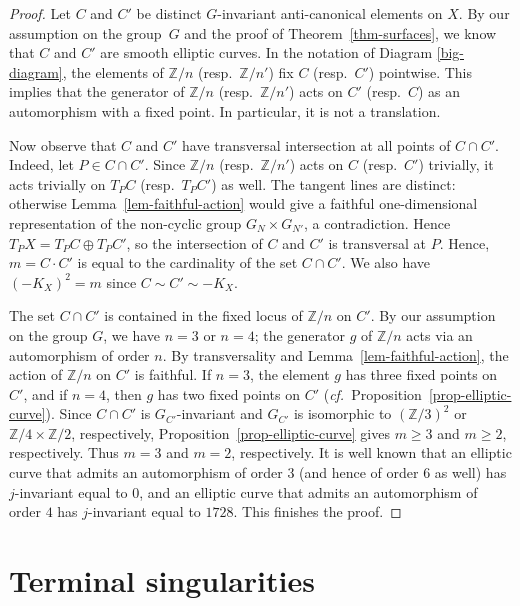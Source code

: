 \documentclass[11pt]{amsart}
\numberwithin{equation}{section}
\theoremstyle{definition}
\theoremstyle{remark}
\begin{document}
\begin{proof}
Let $C$ and $C'$ be distinct $G$-invariant anti-canonical elements on $X$. By our assumption on the group~$G$ and the proof of Theorem~\ref{thm-surfaces},  we know that $C$ and $C'$ are smooth elliptic curves. 
In the notation of Diagram \eqref{big-diagram}, the elements of $\mathbb{Z}/n$ (resp.\ $\mathbb{Z}/n'$) fix $C$ (resp.\ $C'$) pointwise. This implies that the generator of $\mathbb{Z}/n$ (resp.\ $\mathbb{Z}/n'$) acts on $C'$ (resp.\ $C$) as an automorphism with a fixed point. In particular, it is not a translation.

Now observe that $C$ and $C'$ have transversal intersection at all points of $C\cap C'$. Indeed, let $P\in C\cap C'$. Since $\mathbb{Z}/n$ (resp.\ $\mathbb{Z}/n'$) acts on $C$ (resp.\ $C'$) trivially, it acts trivially on $T_PC$  (resp.\ $T_PC'$) as well. The tangent lines are distinct: otherwise Lemma~\ref{lem-faithful-action} would give a faithful one-dimensional representation of the non-cyclic group $G_N\times G_{N'}$, a contradiction. Hence $T_PX = T_PC\oplus T_PC'$, so the intersection of $C$ and $C'$ is transversal at $P$. Hence, $m=C\cdot C'$ is equal to the cardinality of the set $C\cap C'$. We also have $(-K_X)^2=m$ since $C\sim C'\sim -K_X$. 

The set $C\cap C'$ is contained in the fixed locus of $\mathbb{Z}/n$ on $C'$. By our assumption on the group $G$, we have $n=3$ or $n=4$; the generator $g$ of $\mathbb{Z}/n$ acts via an automorphism of order $n$. By transversality and Lemma~\ref{lem-faithful-action}, the action of $\mathbb Z/n$ on $C'$ is faithful. If $n=3$, the element $g$ has three fixed points on $C'$, and if $n=4$, then $g$ has two fixed points on $C'$ (\textit{cf.}~Proposition~\ref{prop-elliptic-curve}). Since $C\cap C'$ is $G_{C'}$-invariant and $G_{C'}$ is isomorphic to $(\mathbb{Z}/3)^2$ or $\mathbb{Z}/4\times\mathbb{Z}/2$, respectively, Proposition~\ref{prop-elliptic-curve} gives $m\geq3$ and $m\geq2$, respectively. Thus $m=3$ and $m=2$, respectively. It is well known that an elliptic curve that admits an automorphism of order $3$ (and hence of order $6$ as well) has $j$-invariant equal to $0$, and an elliptic curve that admits an automorphism of order $4$ has $j$-invariant equal to $1728$. This finishes the proof.
\end{proof}

\section{Terminal singularities}
\label{subsec-terminal-sing}
\end{document}
